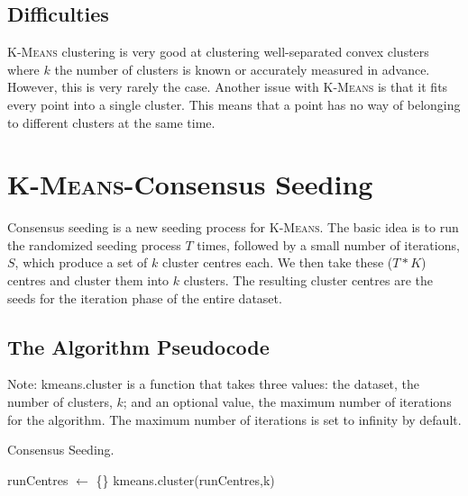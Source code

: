 \documentclass[12pt]{dalthesis}
\newcommand*{\kmeansn}{\textsc{K-Means}} %
\newcommand*{\kmeans}{\textsc{K-Means} } %
\begin{document}
\section{Difficulties}

\kmeans clustering is very good at clustering well-separated convex clusters where $k$ the number of clusters is known or accurately measured in advance. However, this is very rarely the case. Another issue with \kmeans is that it fits every point into a single cluster. This means that a point has no way of belonging to different clusters at the same time. 


\chapter{\kmeansn-Consensus Seeding}

Consensus seeding is a new seeding process for \kmeansn. The basic idea is to run the randomized seeding process $T$ times, followed by a small number of iterations, $S$, which produce a set of $k$ cluster centres each. We then take these ($T*K$) centres and cluster them into $k$ clusters. The resulting cluster centres are the seeds for the iteration phase of the entire dataset.


\section{The Algorithm Pseudocode}

Note: kmeans.cluster is a function that takes three values: the dataset, the number of clusters, $k$; and an optional value, the maximum number of iterations for the algorithm. The maximum number of iterations is set to infinity by default. \\

\begin{algorithm}[H]
  \caption{Consensus Seeding.}
  \SetAlgoLined
  \BlankLine
  \BlankLine
  runCentres $\leftarrow$ \{\}\;
  \Return kmeans.cluster(runCentres,k)
\end{algorithm}
\end{document}
